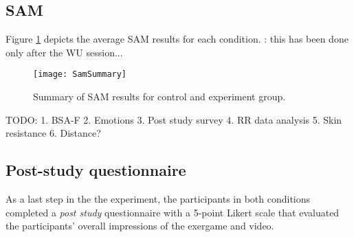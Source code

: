 \subsection{SAM}
Figure \ref{fig:sam} depicts the average SAM results for each condition. : this has been done only after the WU session...\\
\begin{figure}[h]
    \centering
    \texttt{[image: SamSummary]}
    \caption{Summary of SAM results for control and experiment group.}
    \label{fig:sam}
\end{figure}

TODO:
1. BSA-F
2. Emotions
3. Post study survey 
4. RR data analysis
5. Skin resistance
6. Distance?
\subsection{Post-study questionnaire}
As a last step in the the experiment, the participants in both conditions completed  a \textit{post study} questionnaire  with a 5-point Likert scale that evaluated the participants' overall impressions of the exergame and video. 
